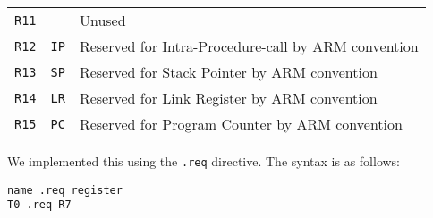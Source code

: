 \begin{table}[h!]
\begin{tabular}{lll}
        \texttt{R11}    & ~                 & Unused                                                 \\
        \texttt{R12}    & \texttt{IP}       & Reserved for Intra-Procedure-call by ARM convention    \\
        \texttt{R13}    & \texttt{SP}       & Reserved for Stack Pointer by ARM convention           \\
        \texttt{R14}    & \texttt{LR}       & Reserved for Link Register  by ARM convention          \\
        \texttt{R15}    & \texttt{PC}       & Reserved for Program Counter by ARM convention         \\
    \end{tabular}
\end{table}

We implemented this using the \texttt{.req} directive. The syntax is as follows:

\begin{lstlisting}[label=register-aliasing,caption=Register aliasing]
name .req register
T0 .req R7
\end{lstlisting}

